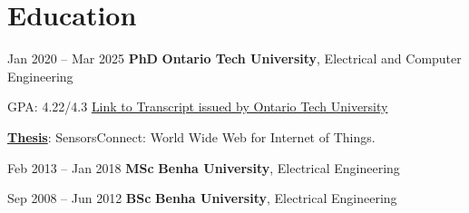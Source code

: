 \vspace{-0.3cm}
    \section{Education}



        
        \begin{twocolentry}{
            Jan 2020 – Mar 2025
        }
            \textbf{PhD} \textbf{Ontario Tech University}, Electrical and Computer Engineering
            \begin{highlights}
                \item GPA: 4.22/4.3 \href{https://learner.mycreds.ca/sharelink/f677e6e2-700e-4b53-a439-30bacbe9bde9/56c2684a-c6e8-480c-9fa4-93d6d649d3fe}{Link to Transcript issued by Ontario Tech University}
                \item \textbf{\href{https://ontariotechu.scholaris.ca/items/ae8fb02b-3cff-4738-aa4b-96834b35dc54/full}{Thesis}}: SensorsConnect: World Wide Web for Internet of Things.
            \end{highlights}
        \end{twocolentry}

\begin{twocolentry}{
           Feb 2013 – Jan 2018
        }
            \textbf{MSc} \textbf{Benha University}, Electrical Engineering
        \end{twocolentry}


\begin{twocolentry}{
            Sep 2008 – Jun 2012
        }
             \textbf{BSc} \textbf{Benha University}, Electrical Engineering
        \end{twocolentry}



